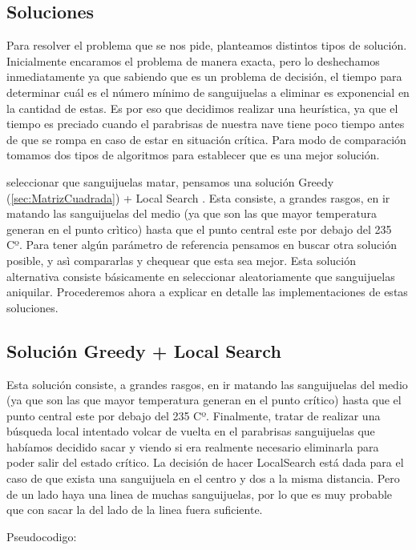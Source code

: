 \newpage

\subsection{Soluciones}

Para resolver el problema que se nos pide, planteamos distintos tipos de solución. Inicialmente encaramos el problema de manera exacta, pero lo deshechamos inmediatamente ya que sabiendo que es un problema de decisión, el tiempo para determinar cuál es el número mínimo de sanguijuelas a eliminar es exponencial en la cantidad de estas. Es por eso que decidimos realizar una heurística, ya que el tiempo es preciado cuando el parabrisas de nuestra nave tiene poco tiempo antes de que se rompa en caso de estar en situación crítica. Para modo de comparación tomamos dos tipos de algoritmos para establecer que es una mejor solución.



seleccionar que sanguijuelas matar, pensamos una solución Greedy  (\ref{sec:MatrizCuadrada}) + Local Search . Esta consiste, a grandes rasgos, en ir matando las sanguijuelas del medio (ya que son las que mayor temperatura generan en el punto crìtico) hasta que el punto central este por debajo del 235 Cº. Para tener algún parámetro de referencia pensamos en buscar otra solución posible, y asì  compararlas y chequear que esta sea mejor. Esta solución alternativa consiste básicamente en seleccionar aleatoriamente que sanguijuelas aniquilar. Procederemos ahora a explicar en detalle las implementaciones de estas soluciones.

\subsection{Solución Greedy + Local Search}
Esta solución consiste, a grandes rasgos, en ir matando las sanguijuelas del medio (ya que son las que mayor temperatura generan en el punto crítico) hasta que el punto central este por debajo del 235 Cº. Finalmente, tratar de realizar una búsqueda local intentado volcar de vuelta en el parabrisas sanguijuelas que habíamos decidido sacar y viendo si era realmente necesario eliminarla para poder salir del estado crítico. La decisión de hacer LocalSearch está dada para el caso de que exista una sanguijuela en el centro y dos a la misma distancia. Pero de un lado haya una linea de muchas sanguijuelas, por lo que es muy probable que con sacar la del lado de la linea fuera suficiente.

Pseudocodigo:

